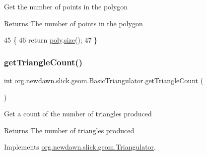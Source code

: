 Get the number of points in the polygon

\begin{DoxyReturn}{Returns}
The number of points in the polygon 
\end{DoxyReturn}

\begin{DoxyCode}
45                                    \{
46         \textcolor{keywordflow}{return} \mbox{\hyperlink{classorg_1_1newdawn_1_1slick_1_1geom_1_1_basic_triangulator_ae57823930e5e5413052560e8c85eb92a}{poly}}.\mbox{\hyperlink{classorg_1_1newdawn_1_1slick_1_1geom_1_1_basic_triangulator_1_1_point_list_acc38c8b7107150c8fd3231250711cc6b}{size}}();
47     \}
\end{DoxyCode}
\mbox{\label{classorg_1_1newdawn_1_1slick_1_1geom_1_1_basic_triangulator_a1deef9bca53fc40ff881923133bb22b1}} 
\subsubsection{\texorpdfstring{get\+Triangle\+Count()}{getTriangleCount()}}
{\footnotesize\ttfamily int org.\+newdawn.\+slick.\+geom.\+Basic\+Triangulator.\+get\+Triangle\+Count (\begin{DoxyParamCaption}{ }\end{DoxyParamCaption})\hspace{0.3cm}{\ttfamily [inline]}}

Get a count of the number of triangles produced

\begin{DoxyReturn}{Returns}
The number of triangles produced 
\end{DoxyReturn}


Implements \mbox{\hyperlink{interfaceorg_1_1newdawn_1_1slick_1_1geom_1_1_triangulator_a7a5d68a694f2b80878c48563b5ea6f1f}{org.\+newdawn.\+slick.\+geom.\+Triangulator}}.


